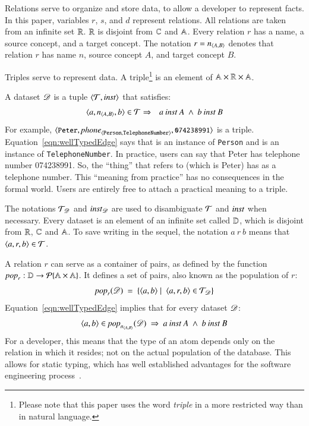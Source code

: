 \documentclass{elsarticle}
\begin{document}
   Relations serve to organize and store data, to allow a developer to represent facts.
   In this paper, variables $r$, $s$, and $d$ represent relations.
   All relations are taken from an infinite set $\mathbb{R}$.
   $\mathbb{R}$ is disjoint from $\mathbb{C}$ and $\mathbb{A}$.
   Every relation $r$ has a name, a source concept, and a target concept.
   The notation $r=\text{\it n\/}_{\langle{A},{B}\rangle}$ denotes that relation $r$ has name $n$, source concept $A$, and target concept $B$.

   Triples serve to represent data.
   A triple\footnote{Please note that this paper uses the word {\em triple} in a more restricted way than in natural language.}
   is an element of $\mathbb{A}\times\mathbb{R}\times\mathbb{A}$.

   A dataset $\mathscr{D}$ is a tuple $\langle{\mathcal{T}},{\mathbin{\text{\it inst\/}}}\rangle$ that satisfies:
\begin{eqnarray}
   \langle{a},{\text{\it n\/}_{\langle{A},{B}\rangle}},{b}\rangle\in\mathcal{T}&\Rightarrow&a\mathbin{\text{\it inst\/}} A\ \wedge\ b\mathbin{\text{\it inst\/}} B
   \label{eqn:wellTypedEdge}
\end{eqnarray}
   For example, $\langle{\text{{\tt\small Peter}}},{\text{\it \text{\it phone\/}\/}_{\langle{\tt Person},{\tt TelephoneNumber}\rangle}},{\text{{\tt\small 074238991}}}\rangle$ is a triple.
   Equation~\ref{eqn:wellTypedEdge} says that  is an instance of {\tt Person} and  is an instance of {\tt TelephoneNumber}.
   In practice, users can say that Peter has telephone number 074238991.
   So, the ``thing'' that  refers to (which is Peter) has  as a telephone number.
   This ``meaning from practice'' has no consequences in the formal world.
   Users are entirely free to attach a practical meaning to a triple.

   The notations $\mathcal{T}_{\mathscr{D}}$ and $\mathbin{\text{\it inst\/}}_{\mathscr{D}}$ are used to disambiguate $\mathcal{T}$ and $\mathbin{\text{\it inst\/}}$ when necessary.
   Every dataset is an element of an infinite set called $\mathbb{D}$,
   which is disjoint from $\mathbb{R}$, $\mathbb{C}$ and $\mathbb{A}$.
   To save writing in the sequel, the notation $a\ r\ b$ means that $\langle{a},{r},{b}\rangle\in\mathcal{T}$.

   A relation $r$ can serve as a container of pairs,
   as defined by the function $\text{\it pop\/}_r:\mathbb{D}\rightarrow\cal{P}\{\mathbb{A}\times\mathbb{A}\}$.
   It defines a set of pairs, also known as the population of $r$:
\begin{equation}
   \pop{r}{\dataset}\ =\ \{ \pair{a}{b}\mid\ \triple{a}{r}{b}\in\triples_{\dataset}\}
\label{eqn:pop}
\end{equation}
   Equation~\ref{eqn:wellTypedEdge} implies that for every dataset $\mathscr{D}$:
\[\pair{a}{b}\in\pop{\declare{n}{A}{B}}{\dataset}\ \Rightarrow\ a\inst A\ \wedge\ b\inst B\]
   For a developer, this means that the type of an atom depends only on the relation in which it resides; not on the actual population of the database.
   This allows for static typing, which has well established advantages for the software engineering process~\cite{HanenbergKRTS14,Petersen2014}.
\end{document}

